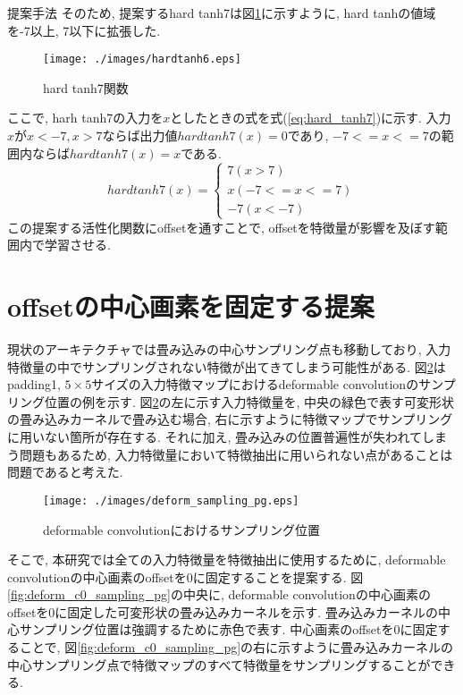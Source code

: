 \begin{chapter}{提案手法}
そのため, 提案するhard tanh7は図\ref{fig:hardtanh6}に示すように, hard tanhの値域を-7以上, 7以下に拡張した. 
\begin{figure}[H]
  \centering
  \texttt{[image: ./images/hardtanh6.eps]}
  \caption{hard tanh7関数}
  \label{fig:hardtanh6}
\end{figure}
ここで, harh tanh7の入力を$x$としたときの式を式(\ref{eq:hard_tanh7})に示す. 入力$x$が$x<-7, x>7$ならば出力値$hardtanh7(x) =0$であり, $-7<=x<=7$の範囲内ならば$hardtanh7(x)=x$である. 
\begin{equation}
  hardtanh7(x) = 
      \begin{cases}
        7  (x>7)\\ 
        x  (-7<=x<=7)\\
        -7  (x<-7) \label{eq:hard_tanh7}
      \end{cases}
\end{equation}
この提案する活性化関数にoffsetを通すことで, offsetを特徴量が影響を及ぼす範囲内で学習させる.

\section{offsetの中心画素を固定する提案}\label{sec:teian_c0}
現状のアーキテクチャでは畳み込みの中心サンプリング点も移動しており, 入力特徴量の中でサンプリングされない特徴が出てきてしまう可能性がある. 図\ref{fig:deform_sampling_pg}はpadding1, $5\times5$サイズの入力特徴マップにおけるdeformable convolutionのサンプリング位置の例を示す. 図\ref{fig:deform_sampling_pg}の左に示す入力特徴量を, 中央の緑色で表す可変形状の畳み込みカーネルで畳み込む場合, 右に示すように特徴マップでサンプリングに用いない箇所が存在する. それに加え, 畳み込みの位置普遍性が失われてしまう問題もあるため, 入力特徴量において特徴抽出に用いられない点があることは問題であると考えた.
\begin{figure}[H]
  \centering
  \texttt{[image: ./images/deform\_sampling\_pg.eps]}
  \caption{deformable convolutionにおけるサンプリング位置}
  \label{fig:deform_sampling_pg}
\end{figure}
そこで, 本研究では全ての入力特徴量を特徴抽出に使用するために, deformable convolutionの中心画素のoffsetを0に固定することを提案する. 図\ref{fig:deform_c0_sampling_pg}の中央に, deformable convolutionの中心画素のoffsetを0に固定した可変形状の畳み込みカーネルを示す. 畳み込みカーネルの中心サンプリング位置は強調するために赤色で表す. 中心画素のoffsetを0に固定することで, 図\ref{fig:deform_c0_sampling_pg}の右に示すように畳み込みカーネルの中心サンプリング点で特徴マップのすべて特徴量をサンプリングすることができる.



\end{chapter}
